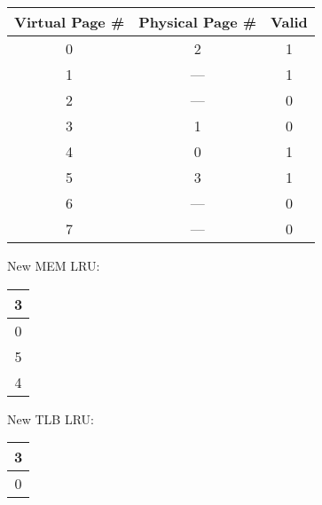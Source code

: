 \documentclass{article}
\begin{document}
{\begin{table}[h!]
          \begin{tabular}{|c|c|c|}
              \hline
              \textbf{Virtual Page \#} & \textbf{Physical Page \#} & \textbf{Valid} \\ \hline
              0 & 2 & 1 \\ \hline
              1 & --- & 1 \\ \hline
              2 & --- & 0 \\ \hline
              3 & 1 & 0 \\ \hline
              4 & 0 & 1 \\ \hline
              5 & 3 & 1 \\ \hline
              6 & --- & 0 \\ \hline
              7 & --- & 0 \\ \hline
          \end{tabular}
     \end{table}
     \linebreak
     \newpage
     New MEM LRU: \\
     \begin{table}[h!]
          \centering
          \begin{tabular}{|c|}
              \hline
              3 \\ \hline
              0 \\ \hline
              5 \\ \hline
              4 \\ \hline
          \end{tabular}
     \end{table}
     \linebreak
     New TLB LRU: \\
     \begin{table}[h!]
          \centering
          \begin{tabular}{|c|}
              \hline
              3 \\ \hline
              0 \\ \hline
          \end{tabular}
     \end{table}
     \linebreak
}
\end{document}
